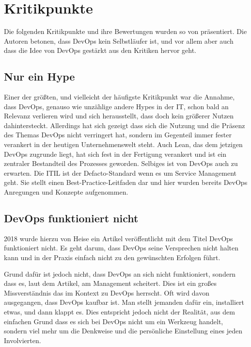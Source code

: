 \section{Kritikpunkte}

Die folgenden Kritikpunkte und ihre Bewertungen wurden so von \citeauthor{halstenberg:2020} \cite{halstenberg:2020} präsentiert. Die Autoren betonen, dass \ac{DevOps} kein Selbstläufer ist, und vor allem aber auch dass die Idee von \ac{DevOps} gestärkt aus den Kritiken hervor geht.

\subsection{Nur ein Hype}

Einer der größten, und vielleicht der häufigste Kritikpunkt war die Annahme, dass \ac{DevOps}, genauso wie unzählige andere Hypes in der IT, schon bald an Relevanz verlieren wird und sich herausstellt, dass doch kein größerer Nutzen dahintersteckt. Allerdings hat sich gezeigt dass sich die Nutzung und die Präsenz des Themas \ac{DevOps} nicht verringert hat, sondern im Gegenteil immer fester verankert in der heutigen Unternehmenswelt steht. Auch Lean, das dem jetzigen \ac{DevOps} zugrunde liegt, hat sich fest in der Fertigung verankert und ist ein zentraler Bestandteil des Prozesses geworden. Selbiges ist von \ac{DevOps} auch zu erwarten. Die \ac{ITIL} ist der Defacto-Standard wenn es um Service Management geht. Sie stellt einen Best-Practice-Leitfaden dar und hier wurden bereits \ac{DevOps} Anregungen und Konzepte aufgenommen.

\subsection{DevOps funktioniert nicht}

2018 wurde hierzu von Heise ein Artikel veröffentlicht mit dem Titel \glqq \ac{DevOps} funktioniert nicht\grqq \cite{weiss:2018}. Es geht darum, dass \ac{DevOps} seine Versprechen nicht halten kann und in der Praxis einfach nicht zu den gewünschten Erfolgen führt.

Grund dafür ist jedoch nicht, dass \ac{DevOps} an sich nicht funktioniert, sondern dass es, laut dem Artikel, am Management scheitert. Dies ist ein großes Missverständnis das im Kontext zu \ac{DevOps} herrscht. Oft wird davon ausgegangen, dass \ac{DevOps} kaufbar ist. Man stellt jemanden dafür ein, installiert etwas, und dann klappt es. Dies entspricht jedoch nicht der Realität, aus dem einfachen Grund dass es sich bei \ac{DevOps} nicht um ein Werkzeug handelt, sondern viel mehr um die Denkweise und die persönliche Einstellung eines jeden Involvierten.

